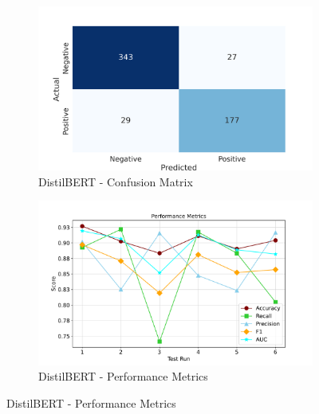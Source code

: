 \begin{figure}[!ht]
    \begin{subfigure}{0.45\linewidth}
        \includegraphics[width=\linewidth]{figures/confusion_distilbert.png}
        \caption{DistilBERT - Confusion Matrix}
    \end{subfigure}
    \hfil
    \begin{subfigure}{0.45\linewidth}
        \includegraphics[width=\linewidth]{figures/metrics_line_distilbert.pdf}
        \caption{DistilBERT - Performance Metrics}
    \end{subfigure}


\end{figure}
